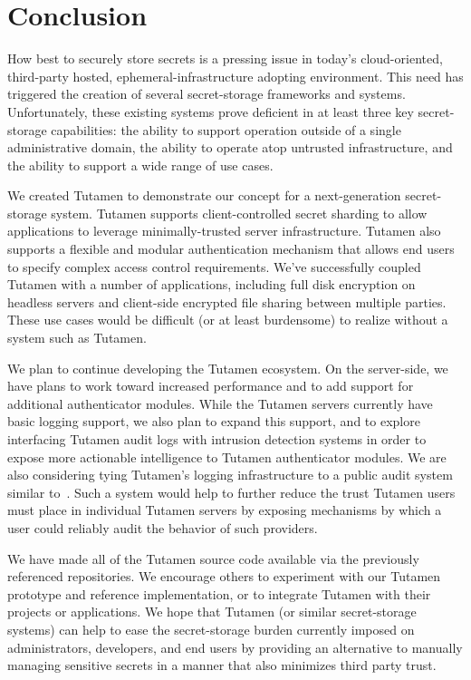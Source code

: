 \section{Conclusion}
\label{sec:conclusion}

How best to securely store secrets is a pressing issue in today's
cloud-oriented, third-party hosted, ephemeral-infrastructure adopting
environment. This need has triggered the creation of several
secret-storage frameworks and systems. Unfortunately, these existing
systems prove deficient in at least three key secret-storage
capabilities: the ability to support operation outside of a single
administrative domain, the ability to operate atop untrusted
infrastructure, and the ability to support a wide range of use cases.

We created Tutamen to demonstrate our concept for a next-generation
secret-storage system. Tutamen supports client-controlled secret
sharding to allow applications to leverage minimally-trusted server
infrastructure. Tutamen also supports a flexible and modular
authentication mechanism that allows end users to specify complex
access control requirements. We've successfully coupled Tutamen with a
number of applications, including full disk encryption on headless
servers and client-side encrypted file sharing between multiple
parties. These use cases would be difficult (or at least burdensome)
to realize without a system such as Tutamen.

We plan to continue developing the Tutamen ecosystem. On the
server-side, we have plans to work toward increased performance and to
add support for additional authenticator modules. While the Tutamen
servers currently have basic logging support, we also plan to expand
this support, and to explore interfacing Tutamen audit logs with
intrusion detection systems in order to expose more actionable
intelligence to Tutamen authenticator modules. We are also considering
tying Tutamen's logging infrastructure to a public audit system
similar to~\cite{laurie2013}. Such a system would help to further
reduce the trust Tutamen users must place in individual Tutamen
servers by exposing mechanisms by which a user could reliably audit
the behavior of such providers.

We have made all of the Tutamen source code available via the
previously referenced repositories. We encourage others to experiment
with our Tutamen prototype and reference implementation, or to
integrate Tutamen with their projects or applications. We hope that
Tutamen (or similar secret-storage systems) can help to ease the
secret-storage burden currently imposed on administrators, developers,
and end users by providing an alternative to manually managing
sensitive secrets in a manner that also minimizes third party trust.

